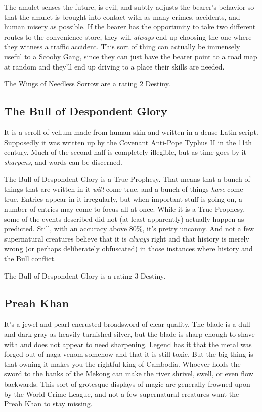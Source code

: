 The amulet senses the future, is evil, and subtly adjusts the bearer's behavior so that the amulet is brought into contact with as many crimes, accidents, and human misery as possible. If the bearer has the opportunity to take two different routes to the convenience store, they will \textit{always} end up choosing the one where they witness a traffic accident. This sort of thing can actually be immensely useful to a Scooby Gang, since they can just have the bearer point to a road map at random and they'll end up driving to a place their skills are needed.

The Wings of Needless Sorrow are a rating 2 Destiny.

\subsection{The Bull of Despondent Glory}
\hspace{\parindent} It is a scroll of vellum made from human skin and written in a dense Latin script. Supposedly it was written up by the Covenant Anti-Pope Typhus II in the 11th century. Much of the second half is completely illegible, but as time goes by it \textit{sharpens}, and words can be discerned.

The Bull of Despondent Glory is a True Prophesy. That means that a bunch of things that are written in it \textit{will} come true, and a bunch of things \textit{have} come true. Entries appear in it irregularly, but when important stuff is going on, a number of entries may come to focus all at once. While it is a True Prophesy, some of the events described did not (at least apparently) actually happen as predicted. Still, with an accuracy above 80\%, it's pretty uncanny. And not a few supernatural creatures believe that it is \textit{always} right and that history is merely wrong (or perhaps deliberately obfuscated) in those instances where history and the Bull conflict.

The Bull of Despondent Glory is a rating 3 Destiny.

\subsection{Preah Khan}
\hspace{\parindent} It's a jewel and pearl encrusted broadsword of clear quality. The blade is a dull and dark gray as heavily tarnished silver, but the blade is sharp enough to shave with and does not appear to need sharpening. Legend has it that the metal was forged out of naga venom somehow and that it is still toxic. But the big thing is that owning it makes you the rightful king of Cambodia. Whoever holds the sword to the banks of the Mekong can make the river shrivel, swell, or even flow backwards. This sort of grotesque displays of magic are generally frowned upon by the World Crime League, and not a few supernatural creatures want the Preah Khan to stay missing.

